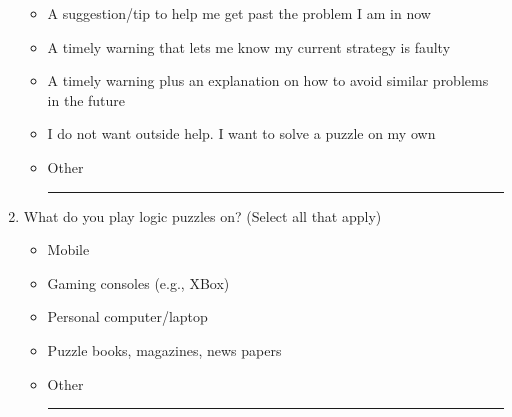 \begin{enumerate}[topsep=-4em]
\begin{itemize}[topsep=-6em, label={o}]
\itemsep-1em 
\item A suggestion/tip to help me get past the problem I am in now
\item A timely warning that lets me know my current strategy is faulty
\item A timely warning plus an explanation on how to avoid similar problems in the future
\item I do not want outside help. I want to solve a puzzle on my own
\item Other \rule{4cm}{0.4pt}
\end{itemize}
\item  What do you play logic puzzles on? (Select all that apply)
\begin{itemize}[topsep=-6em, label={o}]
\itemsep-1em 
\item Mobile
\item Gaming consoles (e.g., XBox)
\item Personal computer/laptop
\item Puzzle books, magazines, news papers
\item Other \rule{4cm}{0.4pt}
\end{itemize}
\end{enumerate}